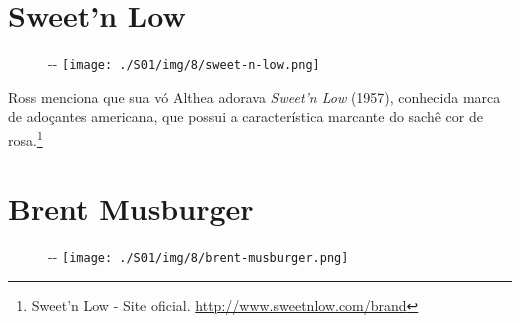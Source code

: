 \hypertarget{sweetn-low}{%
\section{Sweet'n Low}\label{sweetn-low}}

\begin{figure}[!ht]
  \begin{adjustwidth}{-\oddsidemargin-1in}{-\rightmargin}
    \centering
    \texttt{[image: ./S01/img/8/sweet-n-low.png]}
  \end{adjustwidth}
\end{figure}

Ross menciona que sua vó Althea adorava \emph{Sweet'n Low} (1957),
conhecida marca de adoçantes americana, que possui a característica
marcante do sachê cor de rosa.\footnote{\sloppy Sweet’n Low - Site oficial. \url{http://www.sweetnlow.com/brand}}

\hypertarget{brent-musburger}{%
\section{Brent Musburger}\label{brent-musburger}}

\begin{figure}[!ht]
  \begin{adjustwidth}{-\oddsidemargin-1in}{-\rightmargin}
    \centering
    \texttt{[image: ./S01/img/8/brent-musburger.png]}
  \end{adjustwidth}
\end{figure}

